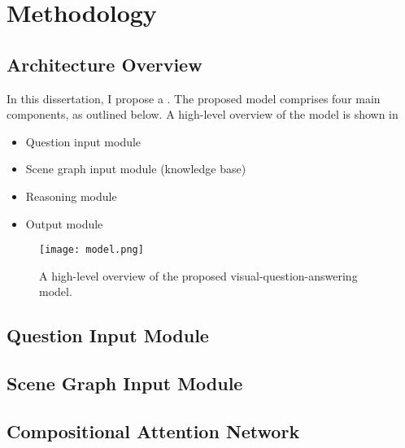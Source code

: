 \chapter{Methodology}
\label{chapter:methodology}

\section{Architecture Overview}
\label{section:architecture_overview}

In this dissertation, I propose a . The proposed model comprises four main components, as outlined below. A high-level overview of the model is shown in \figureautorefname{ \ref{TODO}}

\begin{itemize}
  \item Question input module
  \item Scene graph input module (knowledge base)
  \item Reasoning module
  \item Output module
\end{itemize}

\begin{figure}[htbp]
    \centering
    \texttt{[image: model.png]}
    \caption{A high-level overview of the proposed visual-question-answering model.}
    \label{fig:model_overview}
\end{figure}

\section{Question Input Module}
\label{section:question_input_module}

\section{Scene Graph Input Module}
\label{section:scene_graph_input_module}

\section{Compositional Attention Network}
\label{section:compositional_attention_network}

